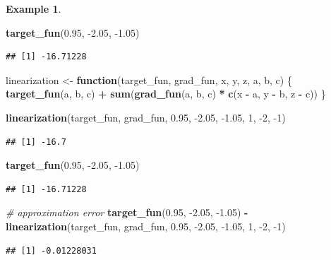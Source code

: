 \documentclass[
]{book}
\newenvironment{Shaded}{\begin{snugshade}}{\end{snugshade}}
\newcommand{\CommentTok}[1]{\textcolor[rgb]{0.56,0.35,0.01}{\textit{#1}}}
\newcommand{\ControlFlowTok}[1]{\textcolor[rgb]{0.13,0.29,0.53}{\textbf{#1}}}
\newcommand{\DecValTok}[1]{\textcolor[rgb]{0.00,0.00,0.81}{#1}}
\newcommand{\FloatTok}[1]{\textcolor[rgb]{0.00,0.00,0.81}{#1}}
\newcommand{\KeywordTok}[1]{\textcolor[rgb]{0.13,0.29,0.53}{\textbf{#1}}}
\newcommand{\NormalTok}[1]{#1}
\newcommand{\OperatorTok}[1]{\textcolor[rgb]{0.81,0.36,0.00}{\textbf{#1}}}
\newcommand{\StringTok}[1]{\textcolor[rgb]{0.31,0.60,0.02}{#1}}
\theoremstyle{definition}
\theoremstyle{definition}
\newtheorem{example}{Example}[chapter]
\theoremstyle{definition}
\theoremstyle{remark}
\begin{document}
\begin{example}
\begin{Shaded}
\begin{Highlighting}[]
\KeywordTok{target_fun}\NormalTok{(}\FloatTok{0.95}\NormalTok{, }\FloatTok{-2.05}\NormalTok{, }\FloatTok{-1.05}\NormalTok{)}
\end{Highlighting}
\end{Shaded}

\begin{verbatim}
## [1] -16.71228
\end{verbatim}

\begin{Shaded}
\begin{Highlighting}[]
\NormalTok{linearization <-}\StringTok{ }\ControlFlowTok{function}\NormalTok{(target_fun, grad_fun, x, y, z, a, b, c) \{}
        \KeywordTok{target_fun}\NormalTok{(a, b, c) }\OperatorTok{+}\StringTok{ }\KeywordTok{sum}\NormalTok{(}\KeywordTok{grad_fun}\NormalTok{(a, b, c) }\OperatorTok{*}\StringTok{ }\KeywordTok{c}\NormalTok{(x }\OperatorTok{-}\StringTok{ }\NormalTok{a, y }\OperatorTok{-}\StringTok{ }\NormalTok{b, z }\OperatorTok{-}\StringTok{ }\NormalTok{c))}
\NormalTok{\}}


\KeywordTok{linearization}\NormalTok{(target_fun, grad_fun, }\FloatTok{0.95}\NormalTok{, }\FloatTok{-2.05}\NormalTok{, }\FloatTok{-1.05}\NormalTok{, }\DecValTok{1}\NormalTok{, }\DecValTok{-2}\NormalTok{, }\DecValTok{-1}\NormalTok{)}
\end{Highlighting}
\end{Shaded}

\begin{verbatim}
## [1] -16.7
\end{verbatim}

\begin{Shaded}
\begin{Highlighting}[]
\KeywordTok{target_fun}\NormalTok{(}\FloatTok{0.95}\NormalTok{, }\FloatTok{-2.05}\NormalTok{, }\FloatTok{-1.05}\NormalTok{)}
\end{Highlighting}
\end{Shaded}

\begin{verbatim}
## [1] -16.71228
\end{verbatim}

\begin{Shaded}
\begin{Highlighting}[]
\CommentTok{# approximation error}
\KeywordTok{target_fun}\NormalTok{(}\FloatTok{0.95}\NormalTok{, }\FloatTok{-2.05}\NormalTok{, }\FloatTok{-1.05}\NormalTok{) }\OperatorTok{-}\StringTok{ }\KeywordTok{linearization}\NormalTok{(target_fun, grad_fun, }\FloatTok{0.95}\NormalTok{, }\FloatTok{-2.05}\NormalTok{, }\FloatTok{-1.05}\NormalTok{, }\DecValTok{1}\NormalTok{, }\DecValTok{-2}\NormalTok{, }\DecValTok{-1}\NormalTok{)}
\end{Highlighting}
\end{Shaded}

\begin{verbatim}
## [1] -0.01228031
\end{verbatim}

\end{example}
\end{document}
